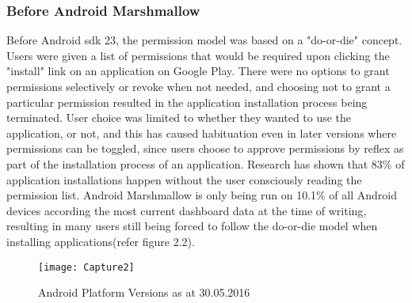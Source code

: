 \subsubsection{Before Android Marshmallow}
Before Android sdk 23, the permission model was based on a "do-or-die" concept. Users were given a list of permissions that would be required upon clicking the "install" link on an application on Google Play. There were no options to grant permissions selectively or revoke when not needed, and choosing not to grant a particular permission resulted in the application installation process being terminated\cite{felt2011effectiveness}. User choice was limited to whether they wanted to use the application, or not, and this has caused habituation even in later versions where permissions can be toggled\cite{wijesekera2015android}, since users choose to approve permissions by reflex as part of the installation process of an application. Research has shown that 83\% of application installations happen without the user consciously reading the permission list\cite{felt2012android}. Android Marshmallow is only being run on 10.1\% of all Android devices according the most current dashboard data at the time of writing\cite{androdashboard}, resulting in many users still being forced to follow the do-or-die model when installing applications(refer figure 2.2). 
\smallskip
\begin{figure}
\texttt{[image: Capture2]}
\caption{Android Platform Versions as at 30.05.2016\cite{androdashboard}}
\end{figure}
\smallskip

